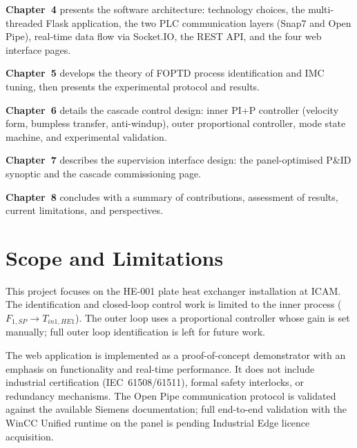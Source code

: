 \textbf{Chapter~4} presents the software architecture: technology choices, the multi-threaded
Flask application, the two PLC communication layers (Snap7 and Open Pipe), real-time
data flow via Socket.IO, the REST API, and the four web interface pages.

\textbf{Chapter~5} develops the theory of FOPTD process identification and IMC tuning,
then presents the experimental protocol and results.

\textbf{Chapter~6} details the cascade control design: inner PI+P controller (velocity
form, bumpless transfer, anti-windup), outer proportional controller, mode state machine,
and experimental validation.

\textbf{Chapter~7} describes the supervision interface design: the panel-optimised P\&ID
synoptic and the cascade commissioning page.

\textbf{Chapter~8} concludes with a summary of contributions, assessment of results,
current limitations, and perspectives.

\section{Scope and Limitations}

This project focuses on the HE-001 plate heat exchanger installation at ICAM. The
identification and closed-loop control work is limited to the inner process
($F_{1,SP} \rightarrow T_{in1,HE1}$). The outer loop uses a proportional controller
whose gain is set manually; full outer loop identification is left for future work.

The web application is implemented as a proof-of-concept demonstrator with an emphasis
on functionality and real-time performance. It does not include industrial certification
(IEC~61508/61511), formal safety interlocks, or redundancy mechanisms. The Open Pipe
communication protocol is validated against the available Siemens documentation; full
end-to-end validation with the WinCC Unified runtime on the panel is pending Industrial
Edge licence acquisition.
